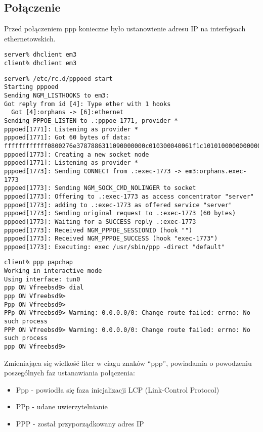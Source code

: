 \documentclass[a4paper,11pt]{article}
\begin{document}
\subsection*{Połączenie}

Przed połączeniem ppp konieczne było ustanowienie adresu IP na interfejsach ethernetowskich.
\begin{verbatim}
server% dhclient em3
client% dhclient em3
\end{verbatim}

\begin{verbatim}
server% /etc/rc.d/pppoed start
Starting pppoed
Sending NGM_LISTHOOKS to em3:
Got reply from id [4]: Type ether with 1 hooks
  Got [4]:orphans -> [6]:ethernet
Sending PPPOE_LISTEN to .:pppoe-1771, provider *
pppoed[1771]: Listening as provider *
pppoed[1771]: Got 60 bytes of data: ffffffffffff0800276e3787886311090000000c010300040061f1c10101000000000000000000000000000000000000000000000000000000000000
pppoed[1773]: Creating a new socket node
pppoed[1771]: Listening as provider *
pppoed[1773]: Sending CONNECT from .:exec-1773 -> em3:orphans.exec-1773
pppoed[1773]: Sending NGM_SOCK_CMD_NOLINGER to socket
pppoed[1773]: Offering to .:exec-1773 as access concentrator "server"
pppoed[1773]: adding to .:exec-1773 as offered service "server"
pppoed[1773]: Sending original request to .:exec-1773 (60 bytes)
pppoed[1773]: Waiting for a SUCCESS reply .:exec-1773
pppoed[1773]: Received NGM_PPPOE_SESSIONID (hook "")
pppoed[1773]: Received NGM_PPPOE_SUCCESS (hook "exec-1773")
pppoed[1773]: Executing: exec /usr/sbin/ppp -direct "default"
\end{verbatim}
\begin{verbatim}
client% ppp papchap
Working in interactive mode
Using interface: tun0
ppp ON Vfreebsd9> dial
ppp ON Vfreebsd9>
Ppp ON Vfreebsd9>
PPp ON Vfreebsd9> Warning: 0.0.0.0/0: Change route failed: errno: No such process
PPP ON Vfreebsd9> Warning: 0.0.0.0/0: Change route failed: errno: No such process
ppp ON Vfreebsd9>
\end{verbatim}


Zmieniająca się wielkość liter w ciagu znaków ``ppp'', powiadamia o powodzeniu poszególnych faz ustanawiania połączenia:
\begin{itemize}
\item Ppp - powiodła się faza inicjalizacji LCP (Link-Control Protocol)
\item PPp - udane uwierzytelnianie
\item PPP - został przyporządkowany adres IP
\end{itemize}
\end{document}
